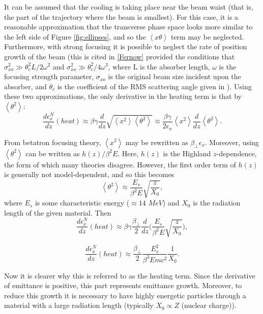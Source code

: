 It can be assumed that the cooling is taking place near the beam waist (that is, the part of the trajectory where the beam is smallest). For this case, it is a reasonable approximation that the transverse phase space looks more similar to the left side of Figure \ref{fig:ellipses}, and so the $\left<x\theta\right>$ term may be neglected. Furthermore, with strong focusing it is possible to neglect the rate of position growth of the beam (this is cited in \ref{Fernow} provided the conditions that $\sigma_{xo}^2 \gg \theta_c^2 L / 2\omega^2$ and $\sigma_{xo}^2 \gg \theta_c^2 / 4\omega^3$, where L is the absorber length, $\omega$ is the focusing strength parameter, $\sigma_{xo}$ is the original beam size incident upon the absorber, and $\theta_c$ is the coefficient of the RMS scattering angle given in \cite{highland}). Using these two approximations, the only derivative in the heating term is that by $\left<\theta^2\right>$:
\begin{equation} \nonumber
\frac{d\epsilon_x^N}{dz}(heat)\approx\beta\gamma\frac{d}{dz}\sqrt{\left<x^2\right>\left<\theta^2\right>}\approx \frac{\beta\gamma}{2\epsilon_x}\left<x^2\right>\frac{d}{dz}\left<\theta^2\right>.
\end{equation}

From betatron focusing theory, $\left<x^2\right>$ may be rewritten as $\beta_\perp \epsilon_x$. Moreover, using \cite{highland} $\left<\theta^2\right>$ can be written as $h(z)/\beta^2E$. Here, $h(z)$ is the Highland $z$-dependence, the form of which many theories disagree. However, the first order term of $h(z)$ is generally not model-dependent, and so this becomes
\begin{equation} \nonumber
\left<\theta^2\right>\approx\frac{E_s}{\beta^2 E}\sqrt{\frac{z}{X_0}},
\end{equation}
where $E_s$ is some characteristic energy ($\approx14$ $MeV$) and $X_0$ is the radiation length of the given material. Then
\begin{equation} \nonumber
\frac{d\epsilon_x^N}{dz}(heat)\approx\beta\gamma\frac{\beta_\perp}{2}\frac{d}{dz}\big(\frac{E_s}{\beta^2 E}\sqrt{\frac{z}{X_0}}\big),
\end{equation}

\begin{equation}
\label{eqn:emittanceheat}
\frac{d\epsilon_x^N}{dz}(heat)\approx\frac{\beta_\perp}{2}\frac{E_s^2}{\beta^3Emc^2}\frac{1}{X_0}.
\end{equation}

Now it is clearer why this is referred to as the heating term. Since the derivative of emittance is positive, this part represents emittance growth. Moreover, to reduce this growth it is necessary to have highly energetic particles through a material with a large radiation length (typically $X_0 \propto Z$ (nuclear charge)).

